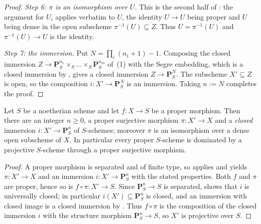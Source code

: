 \begin{proof}
\emph{Step 6: $\pi$ is an isomorphism over $U$.}  This is the second half of
: the argument for $U_i$ applies verbatim to $U$, the
identity $U\to U$ being proper and $U$ being dense in the open subscheme
$\pi^{-1}(U)\subseteq Z$.  Thus $U=\pi^{-1}(U)$ and $\pi^{-1}(U)\to U$ is the
identity.

\emph{Step 7: the immersion.}  Put $N=\prod_i(n_i+1)-1$.  Composing the closed
immersion $Z\to\mathbf P^{n_1}_S\times_S\dots\times_S\mathbf P^{n_m}_S$ of
\,(1) with the Segre embedding, which is a closed
immersion by , gives a closed immersion
$Z\to\mathbf P^N_S$.  The subscheme $X'\subseteq Z$ is open, so the composition
$i\colon X'\to\mathbf P^N_S$ is an immersion.  Taking $n:=N$ completes the
proof.
\end{proof}

\begin{corollary}\label{cor:chow-lemma-proper}
\leanok
Let $S$ be a noetherian scheme and let $f\colon X\to S$ be a proper morphism.
Then there are an integer $n\geq0$, a proper surjective morphism
$\pi\colon X'\to X$ and a \emph{closed} immersion
$i\colon X'\to\mathbf P^n_S$ of $S$-schemes; moreover $\pi$ is an isomorphism
over a dense open subscheme of $X$.  In particular every proper $S$-scheme is
dominated by a projective $S$-scheme through a proper surjective morphism.
\end{corollary}
\begin{proof}
\leanok
A proper morphism is separated and of finite type, so 
applies and yields $\pi\colon X'\to X$ and an immersion
$i\colon X'\to\mathbf P^n_S$ with the stated properties.  Both $f$ and $\pi$
are proper, hence so is $f\circ\pi\colon X'\to S$.  Since $\mathbf P^n_S\to S$
is separated,  shows that $i$ is universally closed; in
particular $i(X')\subseteq\mathbf P^n_S$ is closed, and an immersion with
closed image is a closed immersion by .  Thus $f\circ\pi$
is the composition of the closed immersion $i$ with the structure morphism
$\mathbf P^n_S\to S$, so $X'$ is projective over $S$.
\end{proof}

